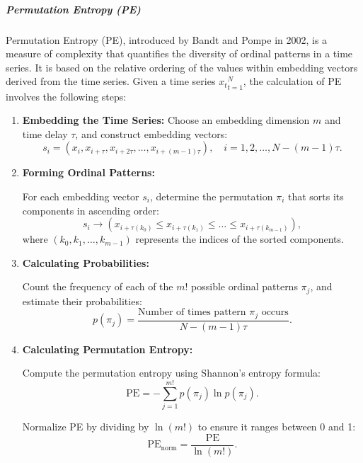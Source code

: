 \subparagraph{Permutation Entropy (PE)}
Permutation Entropy (PE), introduced by Bandt and Pompe in 2002, is a measure of complexity that quantifies the diversity of ordinal patterns in a time series. It is based on the relative ordering of the values within embedding vectors derived from the time series.
Given a time series ${ x_t }_{t=1}^N$, the calculation of PE involves the following steps:

\begin{enumerate} \item \textbf{Embedding the Time Series:}
Choose an embedding dimension $m$ and time delay $\tau$, and construct embedding vectors:
\begin{equation}
    s_i = \left( x_i, x_{i+\tau}, x_{i+2\tau}, \dots, x_{i+(m-1)\tau} \right), \quad i = 1,2,\dots, N - (m -1)\tau.
\end{equation}

\item \textbf{Forming Ordinal Patterns:}

For each embedding vector $s_i$, determine the permutation $\pi_i$ that sorts its components in ascending order:
\begin{equation}
    s_i \rightarrow \left( x_{i+\tau(k_0)} \leq x_{i+\tau(k_1)} \leq \dots \leq x_{i+\tau(k_{m-1})} \right),
\end{equation}
where $(k_0, k_1, \dots, k_{m-1})$ represents the indices of the sorted components.

\item \textbf{Calculating Probabilities:}

Count the frequency of each of the $m!$ possible ordinal patterns $\pi_j$, and estimate their probabilities:
\begin{equation}
    p(\pi_j) = \frac{\text{Number of times pattern } \pi_j \text{ occurs}}{N - (m -1)\tau}.
\end{equation}

\item \textbf{Calculating Permutation Entropy:}

Compute the permutation entropy using Shannon's entropy formula:
\begin{equation}
    \mathrm{PE} = - \sum_{j=1}^{m!} p(\pi_j) \ln p(\pi_j).
\end{equation}

Normalize \ac{PE} by dividing by $\ln(m!)$ to ensure it ranges between 0 and 1:
\begin{equation}
    \mathrm{PE}_{\text{norm}} = \frac{\mathrm{PE}}{\ln(m!)}.
\end{equation}
\end{enumerate}

